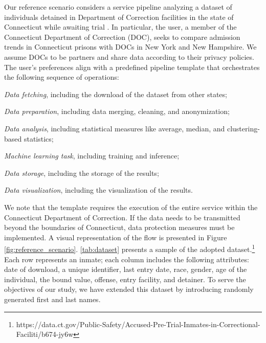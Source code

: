 Our reference scenario considers a service pipeline analyzing a dataset of individuals detained in Department of Correction facilities in the state of Connecticut while awaiting trial \cite{toadd}.
In particular, the user, a member of the Connecticut Department of Correction (DOC), seeks to compare admission trends in Connecticut prisons with DOCs in New York and New Hampshire. We assume DOCs to be partners and share data according to their privacy policies.
The user's preferences align with a predefined pipeline template that orchestrates the following sequence of operations:
\begin{enumerate*}[label=(\roman*)]
  \item \emph{Data fetching}, including the download of the dataset from other states;
  \item \emph{Data preparation}, including data merging, cleaning, and anonymization;
  \item \emph{Data analysis}, including statistical measures like average, median, and clustering-based statistics;
  \item \emph{Machine learning task}, including training and inference;
  \item \emph{Data storage}, including the storage of the results;
  \item \emph{Data visualization}, including the visualization of the results.
\end{enumerate*}

We note that the template requires the execution of the entire service within the Connecticut Department of Correction. If the data needs to be transmitted beyond the boundaries of Connecticut, data protection measures must be implemented. A visual representation of the flow is presented in Figure \ref{fig:reference_scenario}.
%
\cref{tab:dataset} presents a sample of the adopted dataset.\footnote{https://data.ct.gov/Public-Safety/Accused-Pre-Trial-Inmates-in-Correctional-Faciliti/b674-jy6w} Each row represents an inmate; each column includes the following attributes: date of download, a unique identifier, last entry date, race, gender, age of the individual, the bound value, offense, entry facility, and detainer. To serve the objectives of our study, we have extended this dataset by introducing randomly generated first and last names.


